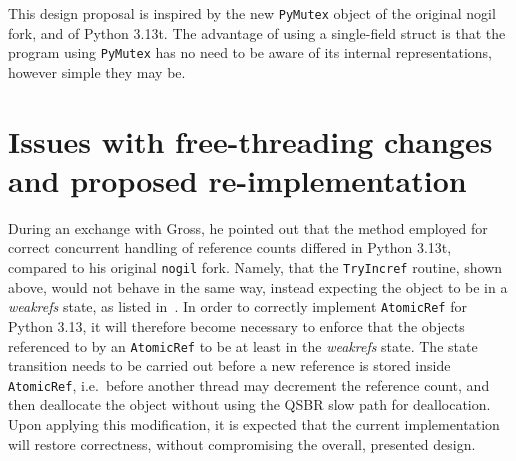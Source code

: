 This design proposal is inspired by the new \texttt{PyMutex} object of the original nogil fork, and of Python 3.13t.
The advantage of using a single-field struct is that the program using \texttt{PyMutex} has no need to be aware of its internal representations, however simple they may be.


\section{Issues with free-threading changes and proposed re-implementation}\label{sec:issues-with-free-threading-changes-and-proposed-re-implementation}

During an exchange with Gross, he pointed out that the method employed for correct concurrent handling of reference counts differed in Python 3.13t, compared to his original \texttt{nogil} fork.
Namely, that the \texttt{TryIncref} routine, shown above, would not behave in the same way, instead expecting the object to be in a \emph{weakrefs} state, as listed in~\cite[\S Biased Reference Counting]{pep703}.
In order to correctly implement \texttt{AtomicRef} for Python 3.13, it will therefore become necessary to enforce that the objects referenced to by an \texttt{AtomicRef} to be at least in the \emph{weakrefs} state.
The state transition needs to be carried out before a new reference is stored inside \texttt{AtomicRef}, i.e.\ before another thread may decrement the reference count, and then deallocate the object without using the QSBR slow path for deallocation.
Upon applying this modification, it is expected that the current implementation will restore correctness, without compromising the overall, presented design.
